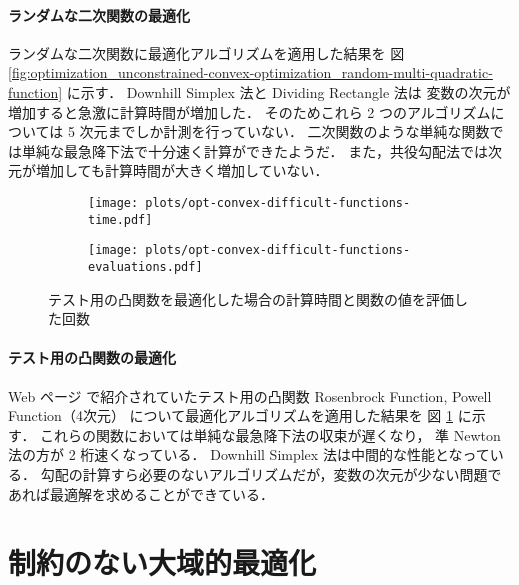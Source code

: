 \paragraph{ランダムな二次関数の最適化}
ランダムな二次関数に最適化アルゴリズムを適用した結果を
図 \ref{fig:optimization_unconstrained-convex-optimization_random-multi-quadratic-function} に示す．
Downhill Simplex 法と Dividing Rectangle 法は
変数の次元が増加すると急激に計算時間が増加した．
そのためこれら 2 つのアルゴリズムについては 5 次元までしか計測を行っていない．
二次関数のような単純な関数では単純な最急降下法で十分速く計算ができたようだ．
また，共役勾配法では次元が増加しても計算時間が大きく増加していない．

\begin{figure}[tp]
    \centering
    \begin{subfigure}{0.85\linewidth}
        \centering
        \texttt{[image: plots/opt-convex-difficult-functions-time.pdf]}
    \end{subfigure}
    \begin{subfigure}{0.85\linewidth}
        \centering
        \texttt{[image: plots/opt-convex-difficult-functions-evaluations.pdf]}
    \end{subfigure}
    \caption{テスト用の凸関数を最適化した場合の計算時間と関数の値を評価した回数}
    \label{fig:optimization_unconstrained-convex-optimization_convex-difficult-function}
\end{figure}

\paragraph{テスト用の凸関数の最適化}
Web ページ \cite{GOTestProblems} で紹介されていたテスト用の凸関数
Rosenbrock Function, Powell Function（4次元） について最適化アルゴリズムを適用した結果を
図 \ref{fig:optimization_unconstrained-convex-optimization_convex-difficult-function} に示す．
これらの関数においては単純な最急降下法の収束が遅くなり，
準 Newton 法の方が 2 桁速くなっている．
Downhill Simplex 法は中間的な性能となっている．
勾配の計算すら必要のないアルゴリズムだが，変数の次元が少ない問題であれば最適解を求めることができている．

\clearpage

\section{制約のない大域的最適化}

